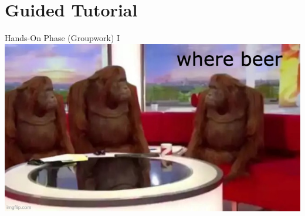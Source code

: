 \documentclass[xetex]{beamer}
\begin{document}
\section{Guided Tutorial}

\begin{frame}{Hands-On Phase (Groupwork) I}
  \centering
  \includegraphics[width=\linewidth]{pic/where-beer}
\end{frame}
\end{document}
